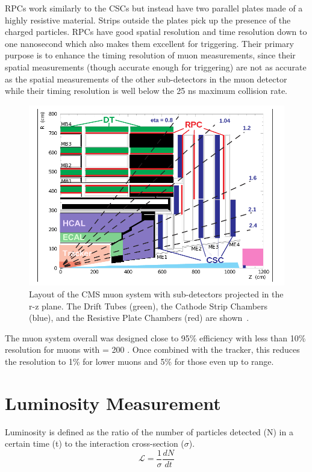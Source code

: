 	RPCs work similarly to the CSCs but instead have two parallel plates made of a highly resistive material. Strips outside the plates pick up the presence of the charged particles. RPCs have good spatial resolution and time resolution down to one nanosecond which also makes them excellent for triggering. Their primary purpose is to enhance the timing resolution of muon measurements, since their spatial measurements (though accurate enough for triggering) are not as accurate as the spatial measurements of the other sub-detectors in the muon detector while their timing resolution is well below the 25 ns maximum collision rate.\\
						\begin{figure}[h]
\begin{center}
\includegraphics[width=0.9\linewidth]{Figs/muon_system.png}
\caption{\label{fig:muonchamber}
Layout of the CMS muon system with sub-detectors projected in the r-z plane. The Drift Tubes (green), the Cathode Strip Chambers (blue), and the Resistive Plate Chambers (red) are shown~\cite{muontdr}.
}
\end{center}
\end{figure}
	
		The muon system overall was designed close to 95\% efficiency with less than 10\% resolution for muons with \pt = 200 \GeV. Once combined with the tracker, this reduces the resolution to 1\% for lower \pt muons and 5\% for those even up to \TeV range.\\
		
		
		
	
	\section{Luminosity Measurement}	
		Luminosity is defined as the ratio of the number of particles detected (N) in a certain time (t) to the interaction cross-section ($\sigma$). 
		\begin{equation}
		\mathcal{L} = \frac{1}{\sigma} \frac{dN}{dt}
		\end{equation}
		
